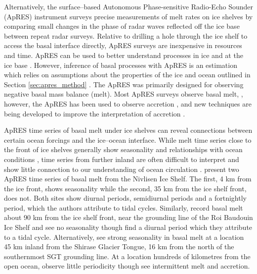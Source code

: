 Alternatively, the surface--based Autonomous Phase-sensitive Radio-Echo Sounder (ApRES) instrument surveys precise measurements of melt rates on ice shelves by comparing small changes in the phase of radar waves reflected off the ice base between repeat radar surveys. 
Relative to drilling a hole through the  ice shelf to access the basal interface directly, ApRES surveys are inexpensive in resources and time. ApRES can be used to better understand processes in ice \citep[e.g.][]{case2022phase} and at the ice base \citep[e.g.][]{sun2019topographic}.  However, inference of basal processes with ApRES is an estimation which relies on assumptions about the properties of the ice and ocean outlined in Section \ref{sec:apres_method} \citep{brennan2014phase}.
The ApRES was primarily designed for observing negative basal mass balance (melt). Most ApRES surveys observe basal melt, \citep[e.g.][] {lindback2019spatial,davis2018variability}, however, the ApRES has been used to observe accretion \citep[e.g.][] {stewart2018ice}, and new techniques are being developed to improve the interpretation of accretion \citep{vavnkova2020observations, vavnkova2021nature}. 


ApRES time series of basal melt under ice shelves can reveal connections between certain ocean forcings and the ice--ocean interface. While melt time series close to the front of ice shelves generally show seasonality and relationships with ocean conditions \citep[e.g.][]{lindback2019spatial}, time series from further inland are often difficult to interpret and show little connection to our understanding of ocean circulation \citep[e.g.][]{davis2018variability}. 
\cite{lindback2019spatial} present two ApRES time series of basal melt from the Nivlisen Ice Shelf. The first, 4 km from the ice front, shows seasonality while the second, 35 km from the  ice shelf front, does not. Both sites show diurnal periods, semidiurnal periods and a fortnightly period, which the authors attribute to tidal cycles. 
Similarly, \citet{sun2019topographic} record basal melt about 90 km from the  ice shelf front, near the grounding line of the Roi Baudouin Ice Shelf and see no seasonality though find a diurnal period which they attribute to a tidal cycle. 
Alternatively, \cite{hirano2020strong} see strong seasonality in basal melt at a location 45 km inland from the Shirase Glacier Tongue, 16 km from the north of the southernmost SGT grounding line.
At a location hundreds of kilometres from the open ocean, \citet{vavnkova2020observations} observe little periodicity though see intermittent melt and accretion. 


